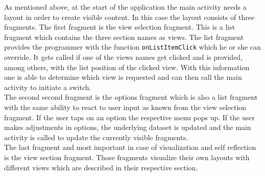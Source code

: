 As  mentioned above, at the start of the application the main activity needs a layout in order to create visible content. In this case the layout consists of three fragments. The first fragment is the view selection fragment. This is a list fragment which contains the three section names as views. The list fragment provides the programmer with the function \lstinline[language=Java]$onListItemClick$ which he or she can override. It gets called if one of the views names get clicked and is provided, among others, with the list position of the clicked view. With this information one is able to determine which view is requested and can then call the main activity to initiate a switch.\\
The second second fragment is the options fragment which is also a list fragment with the same ability to react to user input as known from the view selection fragment. If the user taps on an option the respective menu pops up. If the user makes adjustments in options, the underlying dataset is updated and the main activity is called to update the currently visible fragments.\\
The last fragment and most important in case of visualization and self reflection is the view section fragment. Those fragments visualize their own layouts with different views which are described in their respective section.

